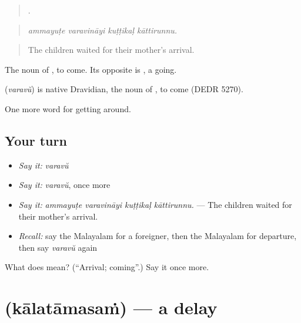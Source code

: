 \begin{quote}
   .
\end{quote}

\begin{quote}
\emph{ammayuṭe varavināyi kuṭṭikaḷ kāttirunnu.}
\end{quote}

\begin{quote}
The children waited for their mother's arrival.
\end{quote}

The noun of , to come. Its opposite is , a going.

\begin{cousinweb}
\textbf{} (\emph{varavŭ}) is native Dravidian, the noun of , to come (DEDR 5270).
\end{cousinweb}

\begin{grammarlens}[title={What you've built}]
One more word for getting around.
\end{grammarlens}

\subsection*{Your turn}
\begin{itemize}
\raggedright
  \item \emph{Say it:} \emph{varavŭ}
  \item \emph{Say it:} \emph{varavŭ}, once more
  \item \emph{Say it:} \emph{ammayuṭe varavināyi kuṭṭikaḷ kāttirunnu.} — The children waited for their mother's arrival.
  \item \emph{Recall:} say the Malayalam for a foreigner, then the Malayalam for departure, then say \emph{varavŭ} again
\end{itemize}

\begin{tcolorbox}[breakable,colback=teal!4,colframe=teal!35!black,title={Before you move on}]
What does  mean? (\textquotedblleft{}Arrival; coming\textquotedblright{}.) Say it once more.
\end{tcolorbox}
\section[\texorpdfstring{\ml{കാലതാമസം} (kālatāmasaṁ)}{കാലതാമസം (kālatāmasaṁ)}]{ (kālatāmasaṁ) — a delay}

